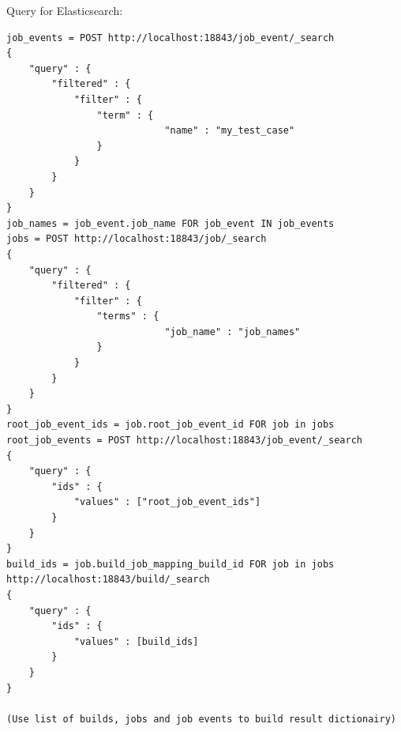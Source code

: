 Query for Elasticsearch:
\begin{verbatim}
job_events = POST http://localhost:18843/job_event/_search
{
    "query" : {
        "filtered" : {
            "filter" : {
                "term" : {
                            "name" : "my_test_case"
                }
            }
        }
    }
}
job_names = job_event.job_name FOR job_event IN job_events
jobs = POST http://localhost:18843/job/_search
{
    "query" : {
        "filtered" : {
            "filter" : {
                "terms" : {
                            "job_name" : "job_names"
                }
            }
        }
    }
}
root_job_event_ids = job.root_job_event_id FOR job in jobs
root_job_events = POST http://localhost:18843/job_event/_search
{ 
    "query" : {
        "ids" : { 
            "values" : ["root_job_event_ids"]
        }
    }
}
build_ids = job.build_job_mapping_build_id FOR job in jobs
http://localhost:18843/build/_search
{ 
    "query" : {
        "ids" : { 
            "values" : [build_ids]
        }
    }
}

(Use list of builds, jobs and job events to build result dictionairy)
\end{verbatim}

 
%
%



